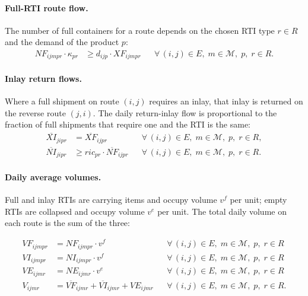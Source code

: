 
\paragraph{Full-RTI route flow.}
The number of full containers for a route depends on the chosen RTI type $r \in R$ and the demand of the product $p$:
\begin{align}
  NF_{ijmpr} \cdot \kappa_{pr} &\geq d_{ijp}\cdot XF_{ijmpr}
  && \forall\,(i,j)\in E,\;m\in\mathcal{M},\;p,\;r\in R.
  \label{eq:demand}
\end{align}


\paragraph{Inlay return flows.}
Where a full shipment on route $(i,j)$ requires an inlay, that
inlay is returned on the reverse route $(j,i)$. The daily
return-inlay flow is proportional to the fraction of full
shipments that require one and the RTI is the same:
%
\begin{align}
  \overline{XI}_{jipr} & = \overline{XF}_{ijpr} && \forall\,(i,j)\in E,\;m\in\mathcal{M},\;p,\;r\in R, \\ 
  \overline{NI}_{jipr} &\geq ric_{pr}\cdot \overline{NF}_{ijpr}
  && \forall\,(i,j)\in E,\;m\in\mathcal{M},\;p,\;r\in R.
  \label{eq:inlay}
\end{align}


\paragraph{Daily average volumes.}
Full and inlay RTIs are carrying items and occupy volume
$v^f$ per unit; empty RTIs are collapsed and occupy volume $v^e$ per unit. The total daily volume on each route
is the sum of the three:

\begin{align}
  VF_{ijmpr} &= {NF}_{ijmpr}\cdot v^f
  && \forall\,(i,j)\in E,\;m\in\mathcal{M},\;p,\;r\in R
  \label{eq:vol-F}\\
  VI_{ijmpr} &= {NI}_{ijmpr}\cdot v^f
  && \forall\,(i,j)\in E,\;m\in\mathcal{M},\;p,\;r\in R
  \label{eq:vol-I}\\
  VE_{ijmr} &= NE_{ijmr}\cdot v^e
  && \forall\,(i,j)\in E,\;m\in\mathcal{M},\;p,\;r\in R
  \label{eq:vol-E}\\
  V_{ijmr}  &= \overline{VF}_{ijmr}+\overline{VI}_{ijmr}+VE_{ijmr}
  && \forall\,(i,j)\in E,\;m\in\mathcal{M},\;p,\;r\in R.
  \label{eq:vol-total}
\end{align}

